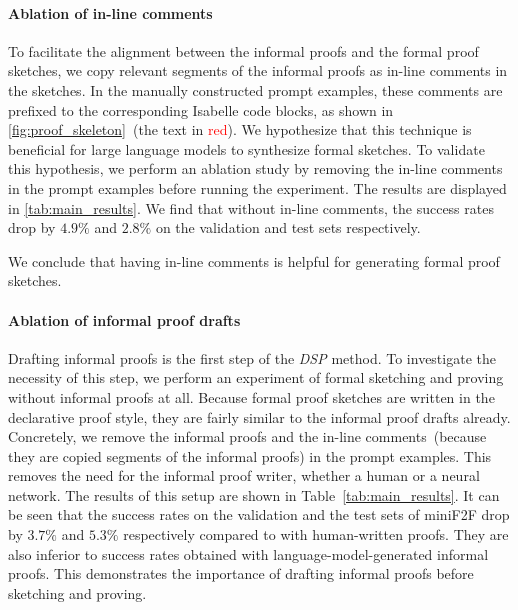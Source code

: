 \paragraph{Ablation of in-line comments}
\label{sec:ablation_line_comms}
To facilitate the alignment between the informal proofs and the formal proof sketches, we copy relevant segments of the informal proofs as in-line comments in the sketches. In the manually constructed prompt examples, these comments are prefixed to the corresponding Isabelle code blocks, as shown in \autoref{fig:proof_skeleton}~(the text in \textcolor{red}{red}). We hypothesize that this technique is beneficial for large language models to synthesize formal sketches. To validate this hypothesis, we perform an ablation study by removing the in-line comments in the prompt examples before running the experiment. The results are displayed in \autoref{tab:main_results}.
We find that without in-line comments, the success rates drop by $4.9\%$ and $2.8\%$ on the validation and test sets respectively.

We conclude that having in-line comments is helpful for generating formal proof sketches.

\paragraph{Ablation of informal proof drafts} Drafting informal proofs is the first step of the \textit{DSP} method. To investigate the necessity of this step, we perform an experiment of formal sketching and proving without informal proofs at all. Because formal proof sketches are written in the declarative proof style, they are fairly similar to the informal proof drafts already. Concretely, we remove the informal proofs and the in-line comments~(because they are copied segments of the informal proofs) in the prompt examples. This removes the need for the informal proof writer, whether a human or a neural network. The results of this setup are shown in Table~\ref{tab:main_results}. It can be seen that the success rates on the validation and the test sets of miniF2F drop by $3.7\%$ and $5.3\%$ respectively compared to with human-written proofs. They are also inferior to success rates obtained with language-model-generated informal proofs. This demonstrates the importance of drafting informal proofs before sketching and proving.

